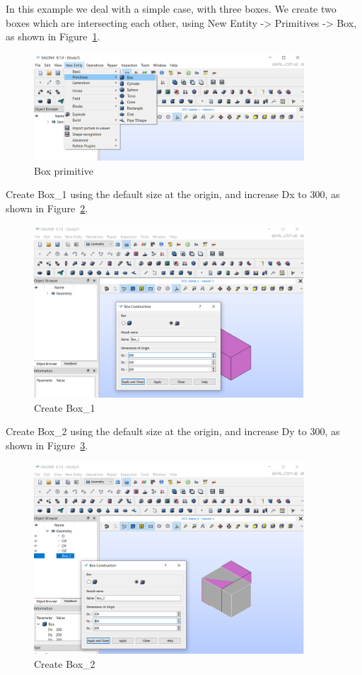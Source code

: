 In this example we deal with a simple case, with three boxes. We create two boxes which are intersecting each other, using New Entity -> Primitives -> Box, as shown in Figure~\ref{fg:salome-02}.

\begin{figure}[H]
\centering
\includegraphics[width=0.9\textwidth]{Salome-02}
\caption{Box primitive}\label{fg:salome-02}
\end{figure}

Create Box\_1 using the default size at the origin, and increase Dx to 300, as shown in Figure~\ref{fg:salome-03}.

\begin{figure}[H]
\centering
\includegraphics[width=0.9\textwidth]{Salome-03}
\caption{Create Box\_1}\label{fg:salome-03}
\end{figure}

Create Box\_2 using the default size at the origin, and increase Dy to 300, as shown in Figure~\ref{fg:salome-04}.

\begin{figure}[H]
\centering
\includegraphics[width=0.9\textwidth]{Salome-04}
\caption{Create Box\_2}\label{fg:salome-04}
\end{figure}


